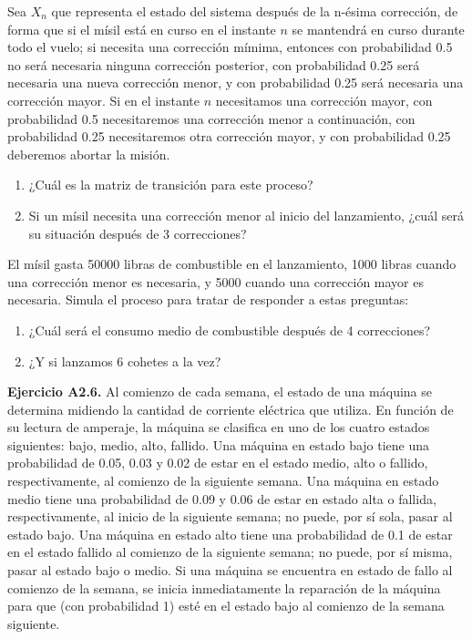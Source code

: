 \documentclass[
]{book}
\providecommand{\tightlist}{%
  \setlength{\itemsep}{0pt}\setlength{\parskip}{0pt}}
\theoremstyle{definition}
\theoremstyle{definition}
\theoremstyle{definition}
\theoremstyle{definition}
\theoremstyle{remark}
\begin{document}
Sea \(X_n\) que representa el estado del sistema después de la n-ésima corrección, de forma que si el mísil está en curso en el instante \(n\) se mantendrá en curso durante todo el vuelo; si necesita una corrección mímima, entonces con probabilidad 0.5 no será necesaria ninguna corrección posterior, con probabilidad 0.25 será necesaria una nueva corrección menor, y con probabilidad 0.25 será necesaria una corrección mayor. Si en el instante \(n\) necesitamos una corrección mayor, con probabilidad 0.5 necesitaremos una corrección menor a continuación, con probabilidad 0.25 necesitaremos otra corrección mayor, y con probabilidad 0.25 deberemos abortar la misión.

\begin{enumerate}
\def\labelenumi{\arabic{enumi}.}
\tightlist
\item
  ¿Cuál es la matriz de transición para este proceso?
\item
  Si un mísil necesita una corrección menor al inicio del lanzamiento, ¿cuál será su situación después de 3 correcciones?
\end{enumerate}

El mísil gasta 50000 libras de combustible en el lanzamiento, 1000 libras cuando una corrección menor es necesaria, y 5000 cuando una corrección mayor es necesaria. Simula el proceso para tratar de responder a estas preguntas:

\begin{enumerate}
\def\labelenumi{\arabic{enumi}.}
\setcounter{enumi}{2}
\tightlist
\item
  ¿Cuál será el consumo medio de combustible después de 4 correcciones?
\item
  ¿Y si lanzamos 6 cohetes a la vez?
\end{enumerate}

\textbf{Ejercicio A2.6.} Al comienzo de cada semana, el estado de una máquina se determina midiendo la cantidad de corriente eléctrica que utiliza. En función de su lectura de amperaje, la máquina se clasifica en uno de los cuatro estados siguientes: bajo, medio, alto, fallido. Una máquina en estado bajo tiene una probabilidad de 0.05, 0.03 y 0.02 de estar en el estado medio, alto o fallido, respectivamente, al comienzo de la siguiente semana. Una máquina en estado medio tiene una probabilidad de 0.09 y 0.06 de estar en estado alta o fallida, respectivamente, al inicio de la siguiente semana; no puede, por sí sola, pasar al estado bajo. Una máquina en estado alto tiene una probabilidad de 0.1 de estar en el estado fallido al comienzo de la siguiente semana; no puede, por sí misma, pasar al estado bajo o medio. Si una máquina se encuentra en estado de fallo al comienzo de la semana, se inicia inmediatamente la reparación de la máquina para que (con probabilidad 1) esté en el estado bajo al comienzo de la semana siguiente.
\end{document}

